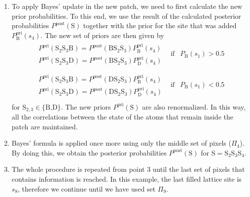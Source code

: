 \documentclass[aps,prl,twocolumn,english,showpacs]{revtex4-1}
\begin{document}
\begin{enumerate}[leftmargin=0.5cm]
\item To apply Bayes' update in the new patch, we need to first calculate the new prior probabilities. To this end, we use the result of the calculated posterior probabilities $P^{\text{post}}(\text{S})$  together with the prior for the site that was added $P_{\text{B}}^{\text{pri}}\left(
s_{4}\right)$. The new set of priors are then given by
\begin{equation}
\begin{array}{ccc}
\begin{array}{c}
P^{\text{pri}}\left( \text{S}_{2}\text{S}_{3}\text{B}\right) =P^{\text{post}}\left( \text{BS}_{2}\text{S}_{3}\right) P_{\text{B}}^{\text{pri}}\left(
s_{4}\right)  \\ 
P^{\text{pri}}\left( \text{S}_{2}\text{S}_{3}\text{D}\right) =P^{\text{post}}\left( \text{BS}_{2}\text{S}_{3}\right) P_{\text{D}}^{\text{pri}}\left(
s_{4}\right) 
\end{array}
& \text{if} & P_{\text{B}}\left( s_{1}\right) >0.5  \\
&  &  \\ 
\begin{array}{c}
P^{\text{pri}}\left( \text{S}_{2}\text{S}_{3}\text{B}\right) =P^{\text{post}}\left( \text{DS}_{2}\text{S}_{3}\right) P_{\text{B}}^{\text{pri}}\left(
s_{4}\right)  \\ 
P^{\text{pri}}\left( \text{S}_{2}\text{S}_{3}\text{D}\right) =P^{\text{post}}\left( \text{DS}_{2}\text{S}_{3}\right) P_{\text{D}}^{\text{pri}}\left(
s_{4}\right) 
\end{array} 
& \text{if} & P_{\text{B}}\left( s_{1}\right) <0.5  \\
\end{array}
\end{equation}
for $\text{S}_{2,3}\in\{\text{B,D}\}$. The new priors $P^{\text{pri}}(\text{S})$ are also renormalized. In this way, all the correlations between the state of the atoms that remain inside the patch are maintained.

\item Bayes' formula is applied once more using only the middle set of pixels ($\Pi_{4}$). By doing this, we obtain the posterior probabilities $P^{\text{post}}(\text{S})$ for $\text{S} = \text{S}_2 \text{S}_3 \text{S}_4$. 

\item  The whole procedure is repeated from point 3 until the last set of pixels that contains information is reached. In this example, the last filled lattice site is $s_8$, therefore we continue until we have used set $\Pi_{9}$.
\end{enumerate}
\end{document}
